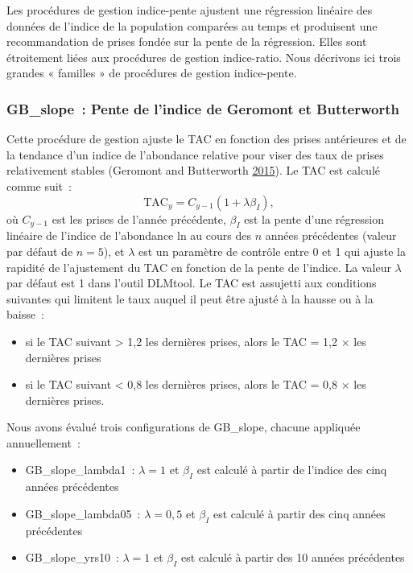\documentclass[11pt]{book}
\begin{document}
Les procédures de gestion indice-pente ajustent une régression linéaire des données de l'indice de la population comparées au temps et produisent une recommandation de prises fondée sur la pente de la régression. Elles sont étroitement liées aux procédures de gestion indice-ratio. Nous décrivons ici trois grandes « familles » de procédures de gestion indice-pente.

\hypertarget{sec:mp-gb-slope}{%
\subsubsection{GB\_slope~: Pente de l'indice de Geromont et Butterworth}\label{sec:mp-gb-slope}}

Cette procédure de gestion ajuste le TAC en fonction des prises antérieures et de la tendance d'un indice de l'abondance relative pour viser des taux de prises relativement stables (Geromont and Butterworth \protect\hyperlink{ref-geromont2015}{2015}). Le TAC est calculé comme suit~:
\begin{equation}
\textrm{TAC}_y= C_{y-1}(1+\lambda \beta_I),
\end{equation}
où \(C_{y-1}\) est les prises de l'année précédente, \(\beta_I\) est la pente d'une régression linéaire de l'indice de l'abondance ln au cours des \(n\) années précédentes (valeur par défaut de \(n = 5\)), et \(\lambda\) est un paramètre de contrôle entre 0 et 1 qui ajuste la rapidité de l'ajustement du TAC en fonction de la pente de l'indice. La valeur \(\lambda\) par défaut est 1 dans l'outil DLMtool. Le TAC est assujetti aux conditions suivantes qui limitent le taux auquel il peut être ajusté à la hausse ou à la baisse~:
\begin{itemize}

\item
  si le TAC suivant \textgreater{} 1,2 les dernières prises, alors le TAC = 1,2 \(\times\) les dernières prises
\item
  si le TAC suivant \textless{} 0,8 les dernières prises, alors le TAC = 0,8 \(\times\) les dernières prises.
\end{itemize}
Nous avons évalué trois configurations de GB\_slope, chacune appliquée annuellement~:
\begin{itemize}
\item
  GB\_slope\_lambda1~: \(\lambda = 1\) et \(\beta_I\) est calculé à partir de l'indice des cinq années précédentes
\item
  GB\_slope\_lambda05~: \(\lambda = 0,5\) et \(\beta_I\) est calculé à partir des cinq années précédentes
\item
  GB\_slope\_yrs10~: \(\lambda = 1\) et \(\beta_I\) est calculé à partir des 10 années précédentes
\end{itemize}
\end{document}
